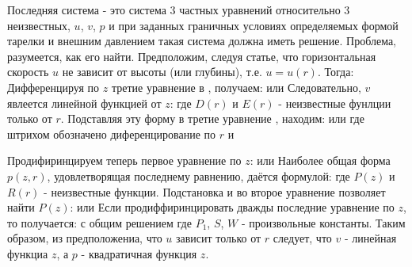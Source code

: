 \documentclass{article}
\begin{document}
Последняя система - это система 3 частных уравнений относительно 3 неизвестных, $u$, $v$, $p$ и при заданных граничных условиях определяемых формой тарелки и внешним давлением такая система должна иметь решение. Проблема, разумеется, как его найти.
\p 
Предположим, следуя статье, что горизонтальная скорость $u$ не зависит от высоты (или глубины), т.е. $u = u(r)$. Тогда:
\p
Дифференцируя по $z$ третие уравнение в , получаем:
или
\p
Следовательно, $v$ явлеется линейной функцией от $z$:
где $D(r)$ и $E(r)$ - неизвестные фунлции только от $r$. Подставляя эту форму в третие уравнение , находим:
или
где штрихом обозначено диференцирование по $r$ и

\p
Продифиринцируем теперь первое уравнение  по $z$:
или
\p
Наиболее общая форма $p(z, r)$, удовлетворящая последнему равнению, даётся формулой:
где $P(z)$ и $R(r)$ - неизвестные функции.
\p
Подстановка  и  во второе уравнение  позволяет найти $P(z)$:
или
\p
Если продиффиринцировать дважды последние уравнение по $z$, то получается:
с общим решением
где $P_1$, $S$, $W$ - произвольные константы. Таким образом, из предположениа, что $u$ зависит только от $r$ следует, что $v$ - линейная функциа $z$, а $p$ - квадратичная функция $z$.
\end{document}

